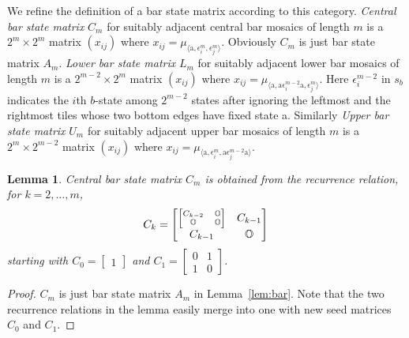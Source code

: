 \documentclass[11pt,a4paper]{amsart}
\newtheorem{lemma}[theorem]{Lemma}
\begin{document}
We refine the definition of a bar state matrix according to this category.
{\em Central bar state matrix\/} $C_m$  for suitably adjacent central bar mosaics of length $m$
is a $2^m \! \times \! 2^m$ matrix $(x_{ij})$ 
where $x_{ij} = \mu_{\langle \text{a}, \epsilon^m_i, \epsilon^m_j \rangle}$.
Obviously $C_m$ is just bar state matrix $A_m$.
{\em Lower bar state matrix\/} $L_m$ for suitably adjacent lower bar mosaics of length $m$
is a $2^{m-2} \! \times \! 2^m$ matrix $(x_{ij})$ 
where $x_{ij} = \mu_{\langle \text{a}, \text{a} \epsilon^{m-2}_i \text{a}, \epsilon^m_j \rangle}$.
Here $\epsilon^{m-2}_i$ in $s_b$ indicates the $i$th $b$-state among $2^{m-2}$ states 
after ignoring the leftmost and the rightmost tiles whose two bottom edges have fixed state a.
Similarly {\em Upper bar state matrix\/} $U_m$ for suitably adjacent upper bar mosaics of length $m$ 
is a $2^m \! \times \! 2^{m-2}$ matrix $(x_{ij})$ 
where $x_{ij} = \mu_{\langle \text{a}, \epsilon^m_i, \text{a} \epsilon^{m-2}_j \text{a} \rangle}$.

\begin{lemma} \label{lem:central}
Central bar state matrix $C_m$ is obtained from the recurrence relation,
for $k = 2, \dots, m$,
$$C_k = \begin{bmatrix}
\scriptsize{\begin{bmatrix} C_{k-2} & \mathbb{O} \\ \mathbb{O} & \mathbb{O} \end{bmatrix}}
& C_{k-1} \\ C_{k-1} & \mathbb{O} \end{bmatrix} $$
starting with
$C_0 = \begin{bmatrix} 1 \end{bmatrix}$ and
$C_1 = \begin{bmatrix} 0 & 1 \\ 1 & 0 \end{bmatrix}$.
\end{lemma}

\begin{proof}
$C_m$ is just bar state matrix $A_m$ in Lemma~\ref{lem:bar}.
Note that the two recurrence relations in the lemma easily merge into one
with new seed matrices $C_0$ and $C_1$.
\end{proof}
\end{document}
